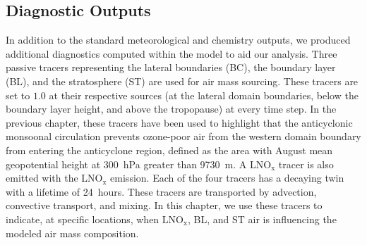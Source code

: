 \subsection{Diagnostic Outputs}

In addition to the standard meteorological and chemistry outputs, we produced additional
diagnostics computed within the model to aid our analysis.
Three passive tracers representing the lateral boundaries (BC), the boundary layer (BL), and the
stratosphere (ST) are used for air mass sourcing. These tracers are set to $1.0$ at their respective
sources (at the lateral domain boundaries, below the boundary layer height, and above
the tropopause) at every time step. In the previous chapter, these
tracers have been used to highlight that the anticyclonic monsoonal circulation prevents
ozone-poor air from the western domain boundary from entering the anticyclone region,
defined as the area with August mean geopotential height at 300~hPa greater than  9730~m.
A LNO$_\mathrm{x}$ tracer is also emitted with the LNO$_\mathrm{x}$ emission. Each of the four tracers has a
decaying twin with a lifetime of 24~hours. These tracers are
transported by advection, convective transport, and mixing. In this chapter, we use these
tracers to indicate, at specific locations, when $\mathrm{LNO_x}$, BL, and ST air
is influencing the modeled air mass composition.

